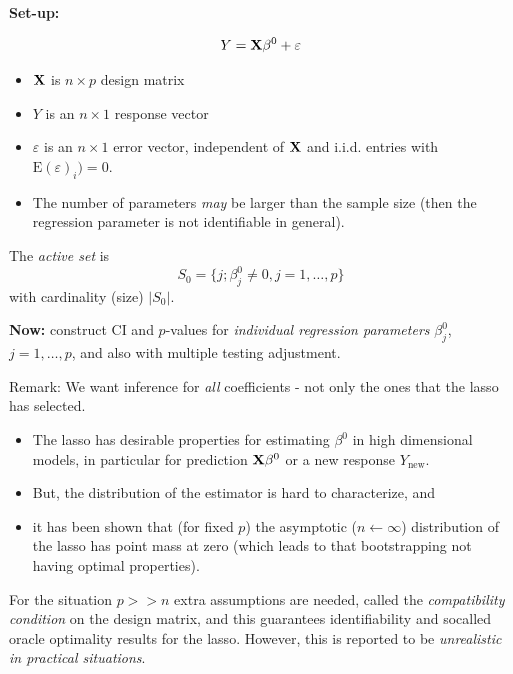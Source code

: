 \documentclass[
  ignorenonframetext,
]{beamer}
\providecommand{\tightlist}{%
  \setlength{\itemsep}{0pt}\setlength{\parskip}{0pt}}
\begin{document}
\begin{frame}

\textbf{Set-up:}

\[Y={\bf X} \beta^0 +\varepsilon\]

\begin{itemize}
\tightlist
\item
  \({\bf X}\) is \(n\times p\) design matrix
\item
  \(Y\) is an \(n \times 1\) response vector
\item
  \(\varepsilon\) is an \(n \times 1\) error vector, independent of
  \({\bf X}\) and i.i.d. entries with \(\text{E}(\varepsilon)_i)=0\).
\item
  The number of parameters \emph{may} be larger than the sample size
  (then the regression parameter is not identifiable in general).
\end{itemize}

The \emph{active set} is \[S_0=\{ j; \beta_j^0 \neq 0,j=1,\ldots,p\}\]
with cardinality (size) \(\lvert S_0 \rvert\).

\textbf{Now:} construct CI and \(p\)-values for \emph{individual
regression parameters} \(\beta_j^0\), \(j=1,\ldots, p\), and also with
multiple testing adjustment.

Remark: We want inference for \emph{all} coefficients - not only the
ones that the lasso has selected.

\end{frame}

\begin{frame}

\begin{itemize}
\tightlist
\item
  The lasso has desirable properties for estimating \(\beta^0\) in high
  dimensional models, in particular for prediction \({\bf X}\beta^0\) or
  a new response \(Y_{\text{new}}\).
\item
  But, the distribution of the estimator is hard to characterize, and
\item
  it has been shown that (for fixed \(p\)) the asymptotic
  (\(n\leftarrow \infty\)) distribution of the lasso has point mass at
  zero (which leads to that bootstrapping not having optimal
  properties).
\end{itemize}

For the situation \(p >> n\) extra assumptions are needed, called the
\emph{compatibility condition} on the design matrix, and this guarantees
identifiability and socalled oracle optimality results for the lasso.
However, this is reported to be \emph{unrealistic in practical
situations}.

\end{frame}
\end{document}
